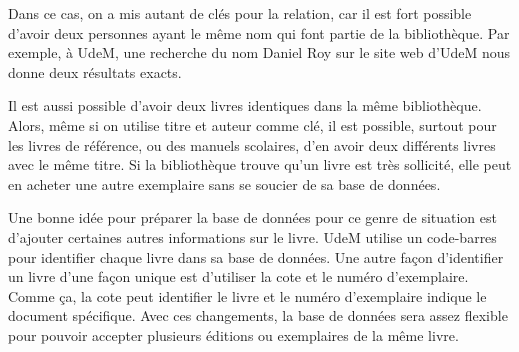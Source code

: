 \documentclass[12pt]{article}
\begin{document}
Dans ce cas, on a mis autant de clés pour la relation, car il est fort possible d'avoir
deux personnes ayant le même nom qui font partie de la bibliothèque. Par exemple, à UdeM,
une recherche du nom Daniel Roy sur le site web d’UdeM nous donne deux résultats exacts.

Il est aussi possible d'avoir deux livres identiques dans la même bibliothèque. Alors,
même si on utilise titre et auteur comme clé, il est possible, surtout pour les livres de
référence, ou des manuels scolaires, d'en avoir deux différents livres avec le même titre.
Si la bibliothèque trouve qu'un livre est très sollicité, elle peut en acheter une autre
exemplaire sans se soucier de sa base de données. 

Une bonne idée pour préparer la base de données pour ce genre de situation est d'ajouter
certaines autres informations sur le livre. UdeM utilise un code-barres pour identifier
chaque livre dans sa base de données. Une autre façon d'identifier un livre d'une façon
unique est d'utiliser la cote et le numéro d'exemplaire. Comme ça, la cote peut identifier
le livre et le numéro d'exemplaire indique le document spécifique. Avec ces changements, 
la base de données sera assez flexible pour pouvoir accepter plusieurs éditions ou 
exemplaires de la même livre. 
\end{document}

